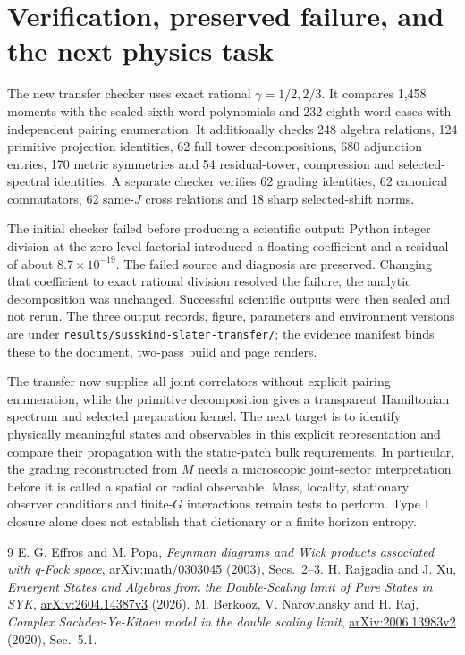 \documentclass[11pt]{article}
\begin{document}
\newpage
\section{Verification, preserved failure, and the next physics task}
The new transfer checker uses exact rational $\gamma=1/2,2/3$.
It compares 1,458 moments with the sealed sixth-word polynomials
and 232 eighth-word cases with independent pairing enumeration.
It additionally checks 248 algebra relations, 124 primitive
projection identities, 62 full tower decompositions, 680
adjunction entries, 170 metric symmetries and 54 residual-tower,
compression and selected-spectral identities. A separate checker
verifies 62 grading identities, 62 canonical commutators, 62
same-$J$ cross relations and 18 sharp selected-shift norms.

The initial checker failed before producing a scientific output:
Python integer division at the zero-level factorial introduced
a floating coefficient and a residual of about $8.7\times10^{-19}$.
The failed source and diagnosis are preserved. Changing that
coefficient to exact rational division resolved the failure;
the analytic decomposition was unchanged. Successful scientific
outputs were then sealed and not rerun. The three output records,
figure, parameters and environment versions are under
\texttt{results/susskind-slater-transfer/}; the evidence manifest
binds these to the document, two-pass build and page renders.

The transfer now supplies all joint correlators without explicit
pairing enumeration, while the primitive decomposition gives a
transparent Hamiltonian spectrum and selected preparation kernel.
The next target is to identify physically meaningful states and
observables in this explicit representation and compare their
propagation with the static-patch bulk requirements. In particular,
the grading reconstructed from $M$ needs a microscopic joint-sector
interpretation before it is called a spatial or radial observable.
Mass, locality, stationary observer conditions and finite-$G$
interactions remain tests to perform. Type I closure alone does
not establish that dictionary or a finite horizon entropy.

\begin{thebibliography}{9}
 E. G. Effros and M. Popa,
\emph{Feynman diagrams and Wick products associated with q-Fock space},
\href{https://arxiv.org/abs/math/0303045}{arXiv:math/0303045} (2003),
Secs.~2--3.
 H. Rajgadia and J. Xu,
\emph{Emergent States and Algebras from the Double-Scaling limit of
Pure States in SYK},
\href{https://arxiv.org/abs/2604.14387v3}{arXiv:2604.14387v3} (2026).
 M. Berkooz, V. Narovlansky and H. Raj,
\emph{Complex Sachdev-Ye-Kitaev model in the double scaling limit},
\href{https://arxiv.org/abs/2006.13983v2}{arXiv:2006.13983v2} (2020),
Sec.~5.1.
\end{thebibliography}
\end{document}
